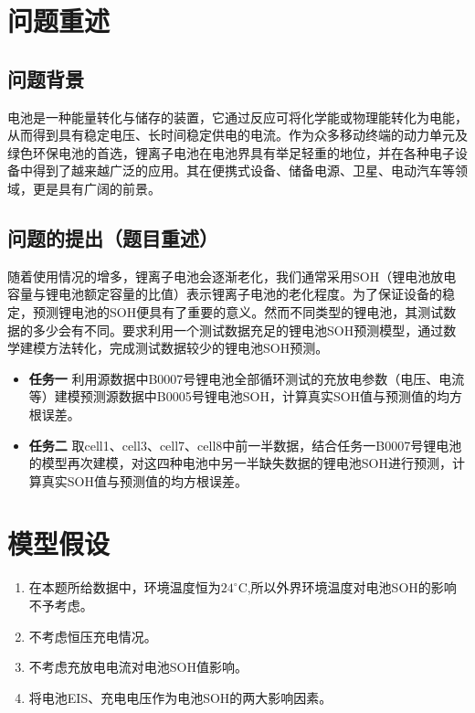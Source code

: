 \documentclass{cumcm}
\title{}
\begin{document}
 

\begin{minipage}{0.9\textwidth}
\centering\LARGE\textbf{}
\end{minipage}
\begin{abstract}

\end{abstract}

\newpage
\section{问题重述}
\subsection{问题背景}
电池是一种能量转化与储存的装置，它通过反应可将化学能或物理能转化为电能，从而得到具有稳定电压、长时间稳定供电的电流。作为众多移动终端的动力单元及绿色环保电池的首选，锂离子电池在电池界具有举足轻重的地位，并在各种电子设备中得到了越来越广泛的应用。其在便携式设备、储备电源、卫星、电动汽车等领域，更是具有广阔的前景。
\subsection{问题的提出（题目重述）}
随着使用情况的增多，锂离子电池会逐渐老化，我们通常采用SOH（锂电池放电容量与锂电池额定容量的比值）表示锂离子电池的老化程度。为了保证设备的稳定，预测锂电池的SOH便具有了重要的意义。然而不同类型的锂电池，其测试数据的多少会有不同。要求利用一个测试数据充足的锂电池SOH预测模型，通过数学建模方法转化，完成测试数据较少的锂电池SOH预测。

\begin{itemize}
\item \textbf{任务一} \quad 利用源数据中B0007号锂电池全部循环测试的充放电参数（电压、电流等）建模预测源数据中B0005号锂电池SOH，计算真实SOH值与预测值的均方根误差。
\item \textbf{任务二} \quad 取cell1、cell3、cell7、cell8中前一半数据，结合任务一B0007号锂电池的模型再次建模，对这四种电池中另一半缺失数据的锂电池SOH进行预测，计算真实SOH值与预测值的均方根误差。
\end{itemize}

\section{模型假设}
\begin{enumerate}
\item 在本题所给数据中，环境温度恒为$24^\circ$C,所以外界环境温度对电池SOH的影响不予考虑。
\item 不考虑恒压充电情况。
\item 不考虑充放电电流对电池SOH值影响。
\item 将电池EIS、充电电压作为电池SOH的两大影响因素。
\end{enumerate}
\end{document}
